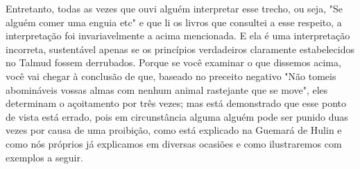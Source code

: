 \begin{itemize}
\begin{enumrate}
\begin{itemize}
\begin{itemize}
\begin{itemize}
Entretanto, todas as vezes que ouvi alguém interpretar esse trecho, ou
seja, "Se alguém comer uma enguia etc" e que li os livros que consultei
a esse respeito, a interpretação foi invariavelmente a acima mencionada.
E ela é uma interpretação incorreta, sustentável apenas se os princípios
verdadeiros cla­ramente estabelecidos no Talmud fossem derrubados.
Porque se você exami­nar o que dissemos acima, você vai chegar à
conclusão de que, baseado no pre­ceito negativo "Não tomeis abomináveis
vossas almas com nenhum animal ras­tejante que se move", eles determinam
o açoitamento por três vezes; mas está demonstrado que esse ponto de
vista está errado, pois em circunstância algu­ma alguém pode ser punido
duas vezes por causa de uma proibição, como está explicado na Guemará de
Hulin e como nós próprios já explicamos em diver­sas ocasiões e como
ilustraremos com exemplos a seguir.


\end{itemize}
\end{itemize}
\end{itemize}
\end{enumrate}
\end{itemize}

